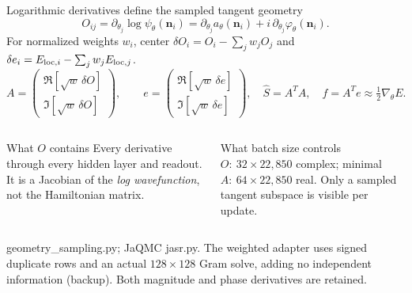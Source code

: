 \documentclass[aspectratio=169,10pt]{beamer}
\newcommand{\src}[1]{\vfill{\fontsize{6.3}{7.5}\selectfont\color{muted}#1\par}}
\newcommand{\nn}{\mathbf n}
\begin{document}
\begin{frame}{Logarithmic derivatives define the sampled tangent geometry}
\[
O_{ij}=\partial_{\theta_j}\log\psi_\theta(\nn_i)
=\partial_{\theta_j}a_\theta(\nn_i)+i\,\partial_{\theta_j}\varphi_\theta(\nn_i).
\]
\small For normalized weights $w_i$, center $\delta O_i=O_i-\sum_jw_jO_j$ and $\delta e_i=E_{{\rm loc},i}-\sum_jw_jE_{{\rm loc},j}$.
\[
A=\begin{pmatrix}\Re[\sqrt w\,\delta O]\\\Im[\sqrt w\,\delta O]\end{pmatrix},\qquad
e=\begin{pmatrix}\Re[\sqrt w\,\delta e]\\\Im[\sqrt w\,\delta e]\end{pmatrix},
\quad \widehat S=A^TA,\quad \widehat f=A^Te\approx\tfrac12\nabla_\theta E.
\]
\begin{columns}[T,onlytextwidth]
\begin{block}{What $O$ contains}
Every derivative through every hidden layer and readout. It is a Jacobian of the \emph{log wavefunction}, not the Hamiltonian matrix.
\end{block}
\begin{block}{What batch size controls}
$O:\ 32\times22,850$ complex; minimal $A:\ 64\times22,850$ real. Only a sampled tangent subspace is visible per update.
\end{block}
\end{columns}
\src{geometry\_sampling.py; JaQMC jasr.py. The weighted adapter uses signed duplicate rows and an actual $128\times128$ Gram solve, adding no independent information (backup). Both magnitude and phase derivatives are retained.}
\end{frame}
\end{document}
